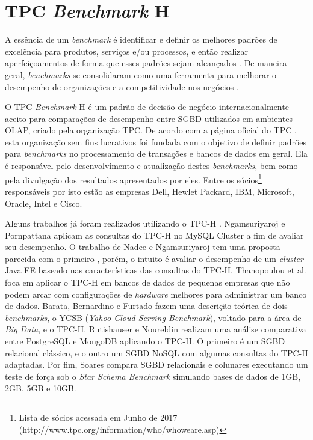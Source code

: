 \chapter{TPC \textit{Benchmark} H}
\label{tpch}

A essência de um \textit{benchmark} é identificar e definir os melhores padrões de excelência para produtos, serviços e/ou processos, e então realizar aperfeiçoamentos de forma que esses padrões sejam alcançados \cite{bhutta1999benchmarking}. De maneira geral, \textit{benchmarks} se consolidaram como uma ferramenta para melhorar o desempenho de organizações e a competitividade nos negócios \cite{kyro2003revising}.

O TPC \textit{\textit{Benchmark}} H é um padrão de decisão de negócio internacionalmente aceito para comparações de desempenho entre SGBD utilizados em ambientes OLAP, criado pela organização TPC. De acordo com a página oficial do TPC \cite{tpc2017page}, esta organização sem fins lucrativos foi fundada com o objetivo de definir padrões para \textit{benchmarks} no processamento de transações e bancos de dados em geral. Ela é responsável pelo desenvolvimento e atualização destes \textit{benchmarks}, bem como pela divulgação dos resultados apresentados por eles. Entre os sócios\footnote{Lista de sócios acessada em Junho de 2017 (http://www.tpc.org/information/who/whoweare.asp)} responsáveis por isto estão as empresas Dell, Hewlet Packard, IBM, Microsoft, Oracle, Intel e Cisco.

Alguns trabalhos já foram realizados utilizando o TPC-H \cite{ngamsuriyaroj2010performance, nadee2012performance, thanopoulou2012benchmarking, barata2014ycsb, rutishauser2012tpc, soares2012avaliaccao}. Ngamsuriyaroj e Pornpattana \cite{ngamsuriyaroj2010performance} aplicam as consultas do TPC-H no MySQL Cluster a fim de avaliar seu desempenho. O trabalho de Nadee e Ngamsuriyaroj \cite{nadee2012performance} tem uma proposta parecida com o primeiro \cite{ngamsuriyaroj2010performance}, porém, o intuito é avaliar o desempenho de um \textit{cluster} Java EE baseado nas características das consultas do TPC-H. Thanopoulou et al. \cite{thanopoulou2012benchmarking} foca em aplicar o TPC-H em bancos de dados de pequenas empresas que não podem arcar com configurações de \textit{hardware} melhores para administrar um banco de dados. Barata, Bernardino e Furtado \cite{barata2014ycsb} fazem uma descrição teórica de dois \textit{benchmarks}, o YCSB (\textit{Yahoo Cloud Serving Benchmark}), voltado para a área de \textit{Big Data}, e o TPC-H. Rutishauser e Noureldin \cite{rutishauser2012tpc} realizam uma análise comparativa entre PostgreSQL e MongoDB aplicando o TPC-H. O primeiro é um SGBD relacional clássico, e o outro um SGBD NoSQL com algumas consultas do TPC-H adaptadas. Por fim, Soares \cite{soares2012avaliaccao} compara SGBD relacionais e colunares executando um teste de força sob o \textit{Star Schema Benchmark} simulando bases de dados de 1GB, 2GB, 5GB e 10GB.

